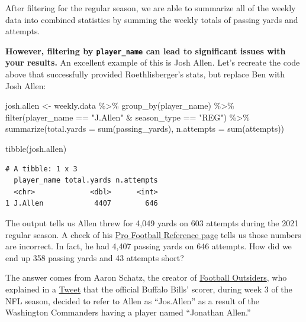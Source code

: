 \documentclass[
  letterpaper,
]{krantz}
\newenvironment{Shaded}{\begin{snugshade}}{\end{snugshade}}
\newcommand{\AttributeTok}[1]{\textcolor[rgb]{0.40,0.45,0.13}{#1}}
\newcommand{\FunctionTok}[1]{\textcolor[rgb]{0.28,0.35,0.67}{#1}}
\newcommand{\NormalTok}[1]{\textcolor[rgb]{0.00,0.23,0.31}{#1}}
\newcommand{\OtherTok}[1]{\textcolor[rgb]{0.00,0.23,0.31}{#1}}
\newcommand{\SpecialCharTok}[1]{\textcolor[rgb]{0.37,0.37,0.37}{#1}}
\newcommand{\StringTok}[1]{\textcolor[rgb]{0.13,0.47,0.30}{#1}}
\begin{document}
After filtering for the regular season, we are able to summarize all of
the weekly data into combined statistics by summing the weekly totals of
passing yards and attempts.

\textbf{However, filtering by \texttt{player\_name} can lead to
significant issues with your results.} An excellent example of this is
Josh Allen. Let's recreate the code above that successfully provided
Roethlisberger's stats, but replace Ben with Josh Allen:

\begin{Shaded}
\begin{Highlighting}[]
\NormalTok{josh.allen }\OtherTok{\textless{}{-}}\NormalTok{ weekly.data }\SpecialCharTok{\%\textgreater{}\%}
  \FunctionTok{group\_by}\NormalTok{(player\_name) }\SpecialCharTok{\%\textgreater{}\%}
  \FunctionTok{filter}\NormalTok{(player\_name }\SpecialCharTok{==} \StringTok{"J.Allen"} \SpecialCharTok{\&}\NormalTok{ season\_type }\SpecialCharTok{==} \StringTok{"REG"}\NormalTok{) }\SpecialCharTok{\%\textgreater{}\%}
  \FunctionTok{summarize}\NormalTok{(}\AttributeTok{total.yards =} \FunctionTok{sum}\NormalTok{(passing\_yards),}
            \AttributeTok{n.attempts =} \FunctionTok{sum}\NormalTok{(attempts))}

\FunctionTok{tibble}\NormalTok{(josh.allen)}
\end{Highlighting}
\end{Shaded}

\begin{verbatim}
# A tibble: 1 x 3
  player_name total.yards n.attempts
  <chr>             <dbl>      <int>
1 J.Allen            4407        646
\end{verbatim}

The output tells us Allen threw for 4,049 yards on 603 attempts during
the 2021 regular season. A check of his
\href{https://www.pro-football-reference.com/players/A/AlleJo02.htm}{Pro
Football Reference page} tells us those numbers are incorrect. In fact,
he had 4,407 passing yards on 646 attempts. How did we end up 358
passing yards and 43 attempts short?

The answer comes from Aaron Schatz, the creator of
\href{https://www.footballoutsiders.com/}{Football Outsiders}, who
explained in a
\href{https://twitter.com/fo_aschatz/status/1442191416826888192?s=21}{Tweet}
that the official Buffalo Bills' scorer, during week 3 of the NFL
season, decided to refer to Allen as ``Jos.Allen'' as a result of the
Washington Commanders having a player named ``Jonathan Allen.''
\end{document}
